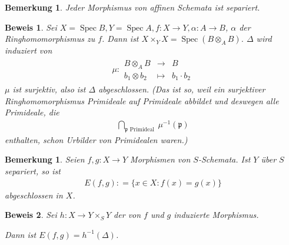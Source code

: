 \documentclass[a4paper,oneside]{scrbook}
\theoremstyle{break}
\newtheorem{Bem}[Def]{Bemerkung}
\theoremstyle{nonumberbreak}
\theoremstyle{nonumberplain}
\newtheorem{Bew}{Beweis}
\theoremstyle{break}
\newcommand{\defeqr}[0]{\mathrel{\mathop:}=}
\newcommand{\Abb}[5]{\ensuremath{#1:\begin{array}{ccc} #2 & \longrightarrow & #3 \\ #4 & \longmapsto & #5 \end{array}}}
\newcommand{\Spec}{%
	\ensuremath{\operatorname{Spec}}%
}
\begin{document}
\begin{Bem}
  \label{bem:7.2}
  Jeder Morphismus von affinen Schemata ist separiert.
\end{Bem}

\begin{Bew}
  Sei $X=\Spec B, Y=\Spec A, f:X\to Y, \alpha:A\to B$, $\alpha$ der Ringhomomorphismus zu $f$.
  Dann ist $X\times_YX=\Spec(B\otimes_A B)$. $\Delta$ wird induziert von
  \begin{align*}
    \Abb{\mu}{B\otimes_A B}{B}{b_1\otimes b_2}{b_1\cdot b_2}
  \end{align*}
  $\mu$ ist surjektiv, also ist $\Delta$ abgeschlossen. (Das ist so, weil ein surjektiver Ringhomomorphismus
  Primideale auf Primideale abbildet und deswegen alle Primideale, die
  \begin{align*}
    \bigcap_{\mathfrak p\text{ Primideal }}\mu^{-1}(\mathfrak p)
  \end{align*}
  enthalten, schon Urbilder von Primidealen waren.)
\end{Bew}

\begin{Bem}
  \label{bem:7.3}
  Seien $f,g:X\to Y$ Morphismen von $S$-Schemata. Ist $Y$ über $S$ separiert, so ist
  \begin{align*}
    E(f,g)\defeqr\{x\in X:f(x)=g(x)\}
  \end{align*}
  abgeschlossen in $X$.
\end{Bem}

\begin{Bew}
  Sei $h:X\to Y\times_S Y$ der von $f$ und $g$ induzierte Morphismus.
  \begin{center}
  \end{center}
  Dann ist $E(f,g)=h^{-1}(\Delta)$.
\end{Bew}



\appendix

\def\indexspace{\par\medskip}
\end{document}

